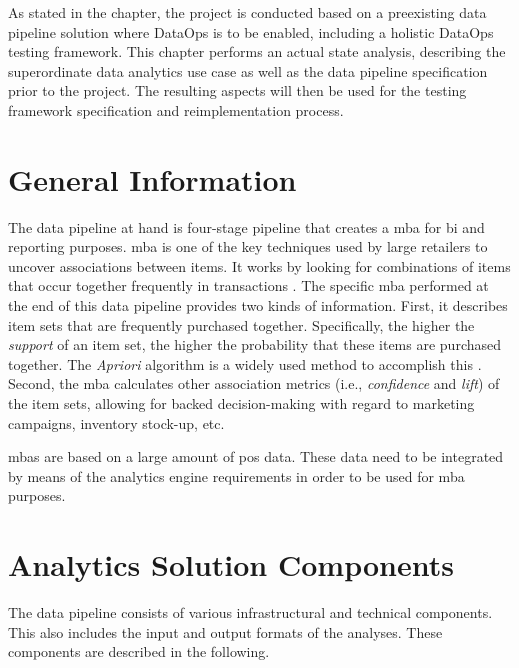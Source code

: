 
As stated in the  chapter, the project is conducted based on a preexisting data pipeline solution where DataOps is to be enabled, including a holistic DataOps testing framework. This chapter performs an actual state analysis, describing the superordinate data analytics use case as well as the data pipeline specification prior to the project. The resulting aspects will then be used for the testing framework specification and reimplementation process.

\section{General Information}
The data pipeline at hand is four-stage pipeline that creates a \acf{mba} for \ac{bi} and reporting purposes. \ac{mba} is one of the key techniques used by large retailers to uncover associations between items. It works by looking for combinations of items that occur together frequently in transactions \cite[1]{Chen2005}. The specific \ac{mba} performed at the end of this data pipeline provides two kinds of information. First, it describes item sets that are frequently purchased together. Specifically, the higher the \textit{support} of an item set, the higher the probability that these items are purchased together. The \textit{Apriori} algorithm is a widely used method to accomplish this \cite[12\psq]{Wu2008}. Second, the \ac{mba} calculates other association metrics (i.e., \textit{confidence} and \textit{lift}) of the item sets, allowing for backed decision-making with regard to marketing campaigns, inventory stock-up, etc.

\acp{mba} are based on a large amount of \ac{pos} data. These data need to be integrated by means of the analytics engine requirements in order to be used for \ac{mba} purposes.

\section{Analytics Solution Components}
The data pipeline consists of various infrastructural and technical components. This also includes the input and output formats of the analyses. These components are described in the following.

